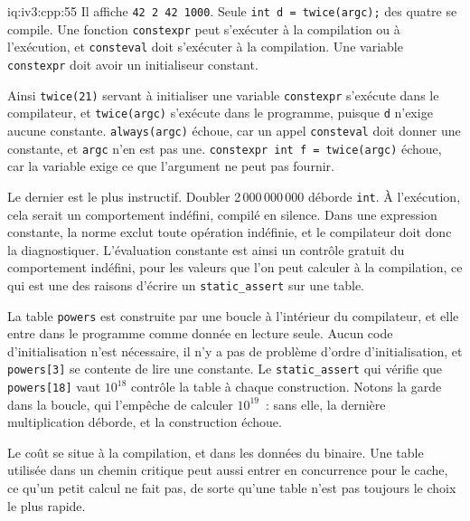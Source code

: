\begin{solution}{iq:iv3:cpp:55}
Il affiche \texttt{42 2 42 1000}. Seule \texttt{int d = twice(argc);} des quatre se compile. Une fonction \texttt{constexpr} peut s'exécuter à la compilation ou à l'exécution, et \texttt{consteval} doit s'exécuter à la compilation. Une variable \texttt{constexpr} doit avoir un initialiseur constant.

Ainsi \texttt{twice(21)} servant à initialiser une variable \texttt{constexpr} s'exécute dans le compilateur, et \texttt{twice(argc)} s'exécute dans le programme, puisque \texttt{d} n'exige aucune constante. \texttt{always(argc)} échoue, car un appel \texttt{consteval} doit donner une constante, et \texttt{argc} n'en est pas une. \texttt{constexpr int f = twice(argc)} échoue, car la variable exige ce que l'argument ne peut pas fournir.

Le dernier est le plus instructif. Doubler 2\,000\,000\,000 déborde \texttt{int}. À l'exécution, cela serait un comportement indéfini, compilé en silence. Dans une expression constante, la norme exclut toute opération indéfinie, et le compilateur doit donc la diagnostiquer. L'évaluation constante est ainsi un contrôle gratuit du comportement indéfini, pour les valeurs que l'on peut calculer à la compilation, ce qui est une des raisons d'écrire un \texttt{static\_assert} sur une table.

La table \texttt{powers} est construite par une boucle à l'intérieur du compilateur, et elle entre dans le programme comme donnée en lecture seule. Aucun code d'initialisation n'est nécessaire, il n'y a pas de problème d'ordre d'initialisation, et \texttt{powers[3]} se contente de lire une constante. Le \texttt{static\_assert} qui vérifie que \texttt{powers[18]} vaut $10^{18}$ contrôle la table à chaque construction. Notons la garde dans la boucle, qui l'empêche de calculer $10^{19}$~: sans elle, la dernière multiplication déborde, et la construction échoue.

Le coût se situe à la compilation, et dans les données du binaire. Une table utilisée dans un chemin critique peut aussi entrer en concurrence pour le cache, ce qu'un petit calcul ne fait pas, de sorte qu'une table n'est pas toujours le choix le plus rapide.

\end{solution}

